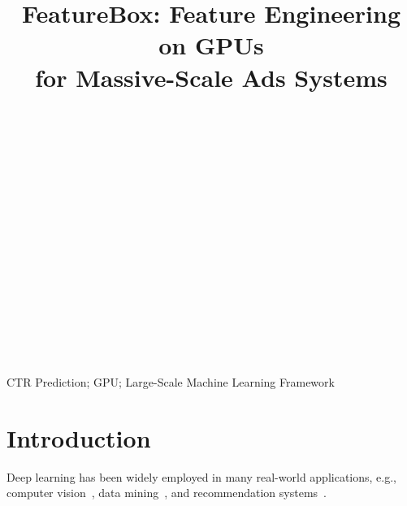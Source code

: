 \documentclass[conference]{IEEEtran}
\begin{document}
\title{FeatureBox: Feature Engineering on GPUs\\ for Massive-Scale Ads Systems} 

\author{
}

\maketitle
 


\begin{abstract}
~~~~\\
~~~~\\
~~~~\\
~~~~\\
~~~~\\
~~~~\\
~~~~\\
~~~~\\
~~~~\\
~~~~\\
~~~~\\
~~~~\\
~~~~\\
~~~~\\
~~~~\\
~~~~\\
\end{abstract}

\begin{IEEEkeywords}
CTR Prediction; GPU; Large-Scale Machine Learning Framework
\end{IEEEkeywords}



\section{Introduction}\label{sec:intro}

Deep learning has been widely employed in many real-world applications, e.g., computer vision~\cite{???}, data mining~\cite{???}, and recommendation systems~\cite{???}. 
\end{document}
